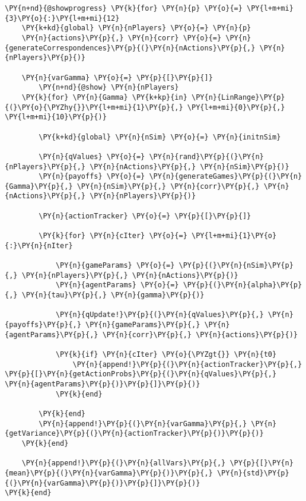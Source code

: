 \documentclass[main.tex]{subfiles}
\begin{document}
    \begin{tcolorbox}[breakable, size=fbox, boxrule=1pt, pad at break*=1mm,colback=cellbackground, colframe=cellborder]
\begin{Verbatim}[commandchars=\\\{\}]
\PY{n+nd}{@showprogress} \PY{k}{for} \PY{n}{p} \PY{o}{=} \PY{l+m+mi}{3}\PY{o}{:}\PY{l+m+mi}{12}
    \PY{k+kd}{global} \PY{n}{nPlayers} \PY{o}{=} \PY{n}{p}
    \PY{n}{actions}\PY{p}{,} \PY{n}{corr} \PY{o}{=} \PY{n}{generateCorrespondences}\PY{p}{(}\PY{n}{nActions}\PY{p}{,} \PY{n}{nPlayers}\PY{p}{)}
    
    \PY{n}{varGamma} \PY{o}{=} \PY{p}{[}\PY{p}{]}
        \PY{n+nd}{@show} \PY{n}{nPlayers}
    \PY{k}{for} \PY{n}{Gamma} \PY{k+kp}{in} \PY{n}{LinRange}\PY{p}{(}\PY{o}{\PYZhy{}}\PY{l+m+mi}{1}\PY{p}{,} \PY{l+m+mi}{0}\PY{p}{,} \PY{l+m+mi}{10}\PY{p}{)}
        
        \PY{k+kd}{global} \PY{n}{nSim} \PY{o}{=} \PY{n}{initnSim}

        \PY{n}{qValues} \PY{o}{=} \PY{n}{rand}\PY{p}{(}\PY{n}{nPlayers}\PY{p}{,} \PY{n}{nActions}\PY{p}{,} \PY{n}{nSim}\PY{p}{)}
        \PY{n}{payoffs} \PY{o}{=} \PY{n}{generateGames}\PY{p}{(}\PY{n}{Gamma}\PY{p}{,} \PY{n}{nSim}\PY{p}{,} \PY{n}{corr}\PY{p}{,} \PY{n}{nActions}\PY{p}{,} \PY{n}{nPlayers}\PY{p}{)}

        \PY{n}{actionTracker} \PY{o}{=} \PY{p}{[}\PY{p}{]}

        \PY{k}{for} \PY{n}{cIter} \PY{o}{=} \PY{l+m+mi}{1}\PY{o}{:}\PY{n}{nIter}
                
            \PY{n}{gameParams} \PY{o}{=} \PY{p}{(}\PY{n}{nSim}\PY{p}{,} \PY{n}{nPlayers}\PY{p}{,} \PY{n}{nActions}\PY{p}{)}
            \PY{n}{agentParams} \PY{o}{=} \PY{p}{(}\PY{n}{alpha}\PY{p}{,} \PY{n}{tau}\PY{p}{,} \PY{n}{gamma}\PY{p}{)}

            \PY{n}{qUpdate!}\PY{p}{(}\PY{n}{qValues}\PY{p}{,} \PY{n}{payoffs}\PY{p}{,} \PY{n}{gameParams}\PY{p}{,} \PY{n}{agentParams}\PY{p}{,} \PY{n}{corr}\PY{p}{,} \PY{n}{actions}\PY{p}{)}
            
            \PY{k}{if} \PY{n}{cIter} \PY{o}{\PYZgt{}} \PY{n}{t0}
                \PY{n}{append!}\PY{p}{(}\PY{n}{actionTracker}\PY{p}{,} \PY{p}{[}\PY{n}{getActionProbs}\PY{p}{(}\PY{n}{qValues}\PY{p}{,} \PY{n}{agentParams}\PY{p}{)}\PY{p}{]}\PY{p}{)}
            \PY{k}{end}

        \PY{k}{end}
        \PY{n}{append!}\PY{p}{(}\PY{n}{varGamma}\PY{p}{,} \PY{n}{getVariance}\PY{p}{(}\PY{n}{actionTracker}\PY{p}{)}\PY{p}{)}
    \PY{k}{end}
    
    \PY{n}{append!}\PY{p}{(}\PY{n}{allVars}\PY{p}{,} \PY{p}{[}\PY{n}{mean}\PY{p}{(}\PY{n}{varGamma}\PY{p}{)}\PY{p}{,} \PY{n}{std}\PY{p}{(}\PY{n}{varGamma}\PY{p}{)}\PY{p}{]}\PY{p}{)}
\PY{k}{end}
\end{Verbatim}
\end{tcolorbox}


    
    
    
\end{document}
